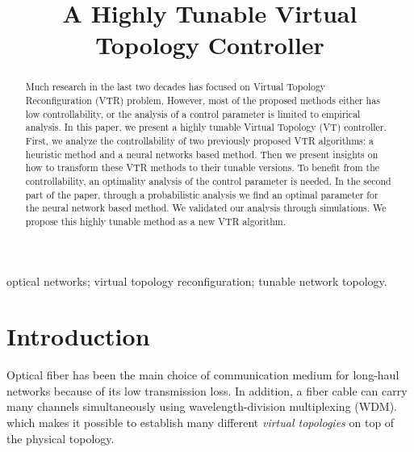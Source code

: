 \documentclass[conference]{IEEEtran}
\begin{document}
 
\title{A Highly Tunable Virtual Topology Controller}	
 
\author{
}
 

 
\maketitle


\begin{abstract}


Much research in the last two decades has focused on Virtual Topology Reconfiguration (VTR) problem. However, most of the proposed methods either has low controllability, or the analysis of a control parameter is limited to empirical analysis. In this paper, we present a highly tunable Virtual Topology (VT) controller. First, we analyze the controllability of two previously proposed VTR algorithms: a heuristic method and a neural networks based method. Then we present insights on how to transform these VTR methods to their tunable versions. To benefit from the controllability, an optimality analysis  of the control parameter is needed. In the second part of the paper, through a probabilistic analysis we find an optimal parameter for the neural network based method. We validated our analysis through simulations. We propose this highly tunable method as a new VTR algorithm.
 
\end{abstract}
 
\begin{IEEEkeywords}
optical networks;  virtual topology reconfiguration; tunable network topology.
\end{IEEEkeywords}

\IEEEpeerreviewmaketitle
\section{Introduction}
Optical fiber has been the main choice of communication medium for long-haul networks because of its low transmission loss.
In addition,  a fiber cable  can carry many channels simultaneously using wavelength-division multiplexing (WDM).  which makes it possible to establish
many different {\em virtual topologies} on top of the physical topology. 
\end{document}
